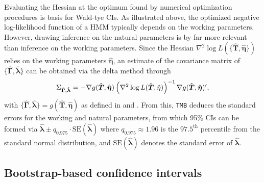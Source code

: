 \documentclass[]{interact}\usepackage[]{graphicx}\usepackage[dvipsnames]{xcolor}
\theoremstyle{plain}%
\theoremstyle{definition}
\theoremstyle{remark}
\newcommand{\hl}[1]{\color{red} \bf{#1}} %
\begin{document}
Evaluating the Hessian at the optimum found by numerical optimization procedures is basis for Wald-tye CIs. As illustrated above, the optimized negative log-likelihood function of a HMM typically depends on the working parameters. However, drawing inference on the natural parameters is by far more relevant than inference on the working parameters. Since the Hessian $\nabla^2\log L(\{\hat{\bm{T}}, \hat{\bm{\eta}}\})$ relies on the working parameters $\hat{\bm{\eta}}$, an estimate of the covariance matrix of $\{\hat{\bm{\Gamma}}, \hat{\bm{\lambda}}\}$ can be obtained via the delta method through
\begin{equation}
\Sigma_{\hat{\bm{\Gamma}}, \hat{\bm{\lambda}}} = - \nabla g(\hat{\bm{T}}, \hat{\bm{\eta}})\left(\nabla^2\log L(\hat{\bm{T}}, \hat{\bf{\eta}})\right)^{-1}\nabla g(\hat{\bm{T}}, \hat{\bm{\eta}})^\prime,
\label{eq:deltamethod}
\end{equation}
with $\{\hat{\bm{\Gamma}}, \hat{\bm{\lambda}}\} = g(\hat{\bm{T}}, \hat{\bm{\eta}})$ as defined in \cite[][Ch.~3.3.1]{zucchini} and \cite{bacri}.
From this, {\tt{TMB}} deduces the standard errors for the working and natural parameters, from which 95\% CIs can be formed via $\hat{\bm{\lambda}} \pm q_{0.975} \cdot \text{SE}(\hat{\bm{\lambda}})$ where $q_{0.975} \approx 1.96$ is the $97.5^{\text{th}}$ percentile from the standard normal distribution, and $\text{SE}(\hat{\bm{\lambda}})$ denotes the standard error of $\hat{\bm{\lambda}}$.

% 
% 

\subsection{Bootstrap-based confidence intervals}
\label{sec:appendix-boostrap}
\end{document}
